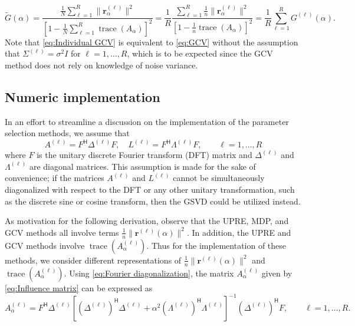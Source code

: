 \documentclass[12pt]{article}
\newcommand{\rVec}{\mathbf{r}}	%
\newcommand{\ctrans}[1]{{#1}^\mathsf{H}}	%
\DeclareMathOperator{\trace}{trace}		%
\newcommand{\regparam}{\alpha}
\newcommand{\noiseSD}{\sigma}	%
\newcommand{\regres}{\mathbf{r}_{\regparam}}	%
\newcommand{\A}{A_{\regparam}}	%
\newcommand{\G}{G}	%
\begin{document}
\begin{equation}
\label{eq:Averaged GCV}
\widetilde{\G}(\regparam) = \frac{\frac{1}{N}\sum_{\ell=1}^R \|\regres^{(\ell)}\|^2}{\left[1 - \frac{1}{N}\sum_{\ell=1}^R \trace\left(\A\right)\right]^2} = \frac{1}{R}\frac{\sum_{\ell=1}^R \frac{1}{n} \|\regres^{(\ell)}\|^2}{\left[1 - \frac{1}{n} \trace\left(\A\right)\right]^2} = \frac{1}{R}\sum_{\ell=1}^R \G^{(\ell)}(\regparam).
\end{equation}
Note that \eqref{eq:Individual GCV} is equivalent to \eqref{eq:GCV} without the assumption that $\Sigma^{(\ell)} = \noiseSD^2 I$ for $\ell = 1,\ldots,R$, which is to be expected since the GCV method does not rely on knowledge of noise variance.

\subsection{Numeric implementation} \label{sec:Implementation}
In an effort to streamline a discussion on the implementation of the parameter selection methods, we assume that
\begin{equation}
\label{eq:Fourier diagonalization}
A^{(\ell)} = \ctrans{F}{\Delta^{(\ell)}}F, \quad L^{(\ell)} = \ctrans{F}{\Lambda^{(\ell)}}F, \qquad \ell = 1,\ldots,R
\end{equation}
where $F$ is the unitary discrete Fourier transform (DFT) matrix and $\Delta^{(\ell)}$ and $\Lambda^{(\ell)}$ are diagonal matrices. This assumption is made for the sake of convenience; if the matrices $A^{(\ell)}$ and $L^{(\ell)}$ cannot be simultaneously diagonalized with respect to the DFT or any other unitary transformation, such as the discrete sine or cosine transform, then the GSVD could be utilized instead. \par
As motivation for the following derivation, observe that the UPRE, MDP, and GCV methods all involve terms $\frac{1}{n}\|\rVec^{(\ell)}(\regparam)\|^2$. In addition, the UPRE and GCV methods involve $\trace(\A^{(\ell)})$. Thus for the implementation of these methods, we consider different representations of $\frac{1}{n}\|\rVec^{(\ell)}(\regparam)\|^2$ and $\trace(\A^{(\ell)})$. Using \eqref{eq:Fourier diagonalization}, the matrix $\A^{(\ell)}$ given by \eqref{eq:Influence matrix} can be expressed as
\begin{equation}
\label{eq:Fourier diagonalization 2}
\A^{(\ell)} = \ctrans{F}\Delta^{(\ell)}\left[\ctrans{(\Delta^{(\ell)})}\Delta^{(\ell)} + \regparam^2\ctrans{(\Lambda^{(\ell)})}\Lambda^{(\ell)}\right]^{-1}\ctrans{(\Delta^{(\ell)})}F, \qquad \ell = 1,\ldots,R.
\end{equation}
\end{document}
